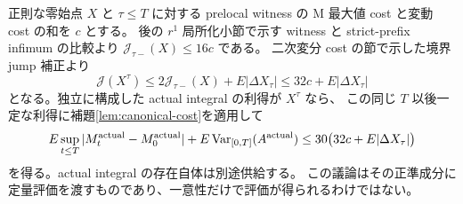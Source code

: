 正則な零始点 $X$ と $\tau\leq T$ に対する prelocal witness の
M 最大値 cost と変動 cost の和を $c$ とする。
後の $r^1$ 局所化小節で示す witness と strict-prefix infimum の比較より $\mathcal J_{\tau-}(X)\leq16c$ である。
二次変分 cost の節で示した境界 jump 補正より
\[
 \mathcal J(X^\tau)\leq2\mathcal J_{\tau-}(X)+E|\Delta X_\tau|
 \leq32c+E|\Delta X_\tau|
\]
となる。独立に構成した actual integral の利得が $X^\tau$ なら、
この同じ $T$ 以後一定な利得に補題\ref{lem:canonical-cost}を適用して
\begin{equation}\label{eq:actual-closed-cost}
 E\sup_{t\leq T}|M^{\rm actual}_t-M^{\rm actual}_0|
 +E\operatorname{Var}_{[0,T]}(A^{\rm actual})
 \leq30\bigl(32c+E|\Delta X_\tau|\bigr)
\end{equation}
を得る。actual integral の存在自体は別途供給する。
この議論はその正準成分に定量評価を渡すものであり、一意性だけで評価が得られるわけではない。

